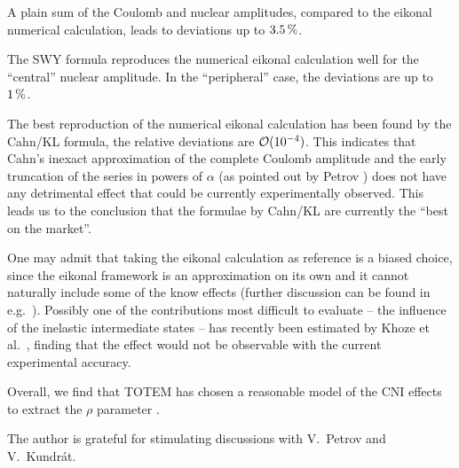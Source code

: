 \documentclass[pdftex,twocolumn,epjc3]{svjour3}
\def\un#1{\,{\rm #1}}
\begin{document}
A plain sum of the Coulomb and nuclear amplitudes, compared to the eikonal numerical calculation, leads to deviations up to $3.5\un{\%}$.

The SWY formula reproduces the numerical eikonal calculation well for the ``central'' nuclear amplitude. In the ``peripheral'' case, the deviations are up to $1\un{\%}$.

The best reproduction of the numerical eikonal calculation has been found by the Cahn/KL formula, the relative deviations are ${\cal O}(10^{-4})$. This indicates that Cahn's inexact approximation of the complete Coulomb amplitude and the early truncation of the series in powers of $\alpha$ (as pointed out by Petrov \cite{petrov2019}) does not have any detrimental effect that could be currently experimentally observed. This leads us to the conclusion that the formulae by Cahn/KL are currently the ``best on the market''.

One may admit that taking the eikonal calculation as reference is a biased choice, since the eikonal framework is an approximation on its own and it cannot naturally include some of the know effects (further discussion can be found in e.g.~\cite{thesis,petrov2018,kmr2019}). Possibly one of the contributions most difficult to evaluate -- the influence of the inelastic intermediate states -- has recently been estimated by Khoze et al.~\cite{kmr2019}, finding that the effect would not be observable with the current experimental accuracy.

Overall, we find that TOTEM has chosen a reasonable model of the CNI effects to extract the $\rho$ parameter \cite{totem-13tev-rho}.




\begin{acknowledgements}
The author is grateful for stimulating discussions with V.~Petrov and V.~Kundr\'at.
\end{acknowledgements}


\def\journal#1#2#3#4{
	#1 #2 (#3) #4
}
\end{document}
